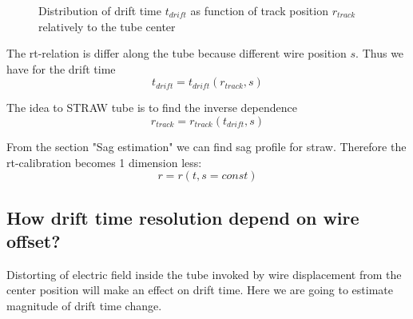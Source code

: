 \documentclass[]{article}
\begin{document}
	\begin{figure}[h!]
		\centering
		\qquad
		\caption{Distribution of drift time $t_{drift}$ as function of track position $r_{track}$ relatively to the tube center}			
	\end{figure}	
	
	The rt-relation is differ along the tube because different wire position $s$. Thus we have for the drift time 
	\begin{equation}
	t_{drift} = t_{drift}(r_{track},s)
	\end{equation}
	
	The idea to STRAW tube is to find the inverse dependence
	\begin{equation}
		r_{track} = r_{track}(t_{drift},s)
	\end{equation}
	
	From the section "Sag estimation" we can find sag profile for straw. Therefore the rt-calibration becomes 1 dimension less:
	\begin{equation}
		r = r(t,s=const)
	\end{equation}
	
	
	\subsection{ How drift time resolution depend on wire offset?}
	
	Distorting of electric field inside the tube invoked by wire displacement from the center position will make an effect on drift time. Here we are going to estimate magnitude of drift time change.
	
\end{document}
